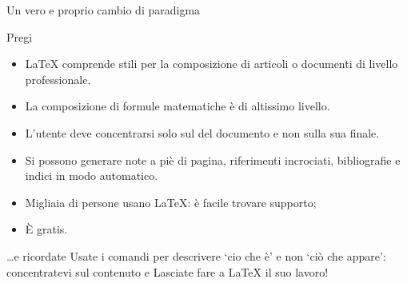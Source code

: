 \documentclass{beamer}
\begin{document}

\begin{frame}[fragile]{Un vero e proprio cambio di paradigma}

\begin{block}{Pregi}
\begin{itemize}
	\item \LaTeX{} comprende stili per la composizione di articoli o documenti di livello professionale.
	\item La composizione di formule matematiche \`e di altissimo livello.
	\item L'utente deve concentrarsi solo sul  del documento e non sulla sua  finale.
	\item Si possono generare note a pi\`e di pagina, riferimenti incrociati,
	bibliografie e indici in modo automatico.
	\item Migliaia di persone usano \LaTeX: è facile trovare supporto;
	\item \`E gratis.
\end{itemize}
\end{block}


\begin{alertblock}{\ldots e ricordate}
Usate i comandi per descrivere `cio che \`e' e non `ci\`o che appare': concentratevi sul contenuto e Lasciate fare a \LaTeX{} il suo lavoro!
\end{alertblock}
\end{frame}
\end{document}
